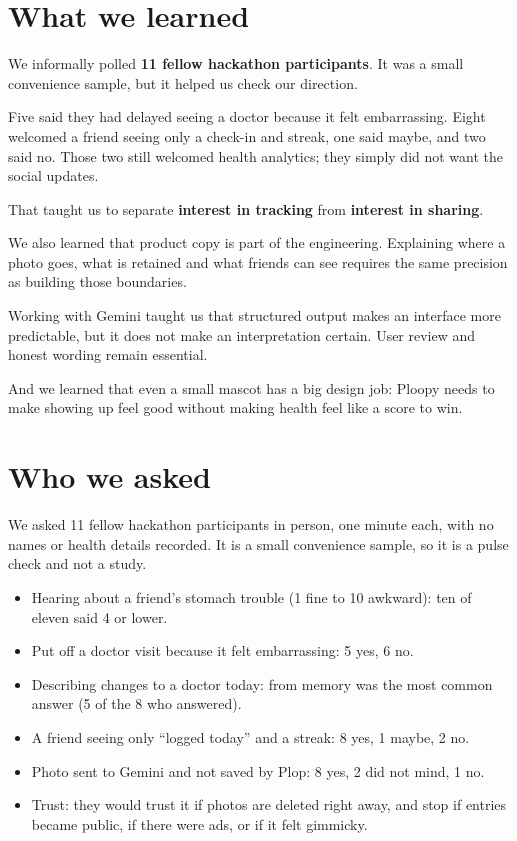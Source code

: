 \documentclass[11pt]{article}
\begin{document}
\section*{What we learned}

We informally polled \textbf{11 fellow hackathon participants}. It was a small convenience sample, but it helped us check our direction.

Five said they had delayed seeing a doctor because it felt embarrassing. Eight welcomed a friend seeing only a check-in and streak, one said maybe, and two said no. Those two still welcomed health analytics; they simply did not want the social updates.

That taught us to separate \textbf{interest in tracking} from \textbf{interest in sharing}.

We also learned that product copy is part of the engineering. Explaining where a photo goes, what is retained and what friends can see requires the same precision as building those boundaries.

Working with Gemini taught us that structured output makes an interface more predictable, but it does not make an interpretation certain. User review and honest wording remain essential.

And we learned that even a small mascot has a big design job: Ploopy needs to make showing up feel good without making health feel like a score to win.

\section*{Who we asked}

We asked 11 fellow hackathon participants in person, one minute each, with no names or health details recorded. It is a small convenience sample, so it is a pulse check and not a study.

\begin{itemize}
  \item Hearing about a friend's stomach trouble (1 fine to 10 awkward): ten of eleven said 4 or lower.
  \item Put off a doctor visit because it felt embarrassing: 5 yes, 6 no.
  \item Describing changes to a doctor today: from memory was the most common answer (5 of the 8 who answered).
  \item A friend seeing only ``logged today'' and a streak: 8 yes, 1 maybe, 2 no.
  \item Photo sent to Gemini and not saved by Plop: 8 yes, 2 did not mind, 1 no.
  \item Trust: they would trust it if photos are deleted right away, and stop if entries became public, if there were ads, or if it felt gimmicky.
\end{itemize}
\end{document}
